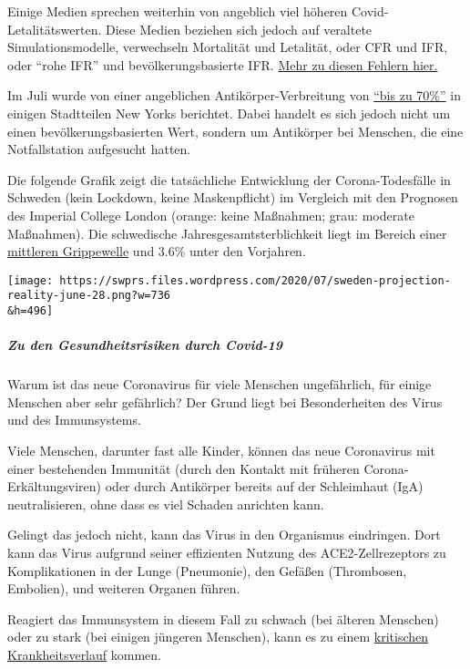 Einige Medien sprechen weiterhin von angeblich viel höheren
Covid-Letalitätswerten. Diese Medien beziehen sich jedoch auf veraltete
Simulationsmodelle, verwechseln Mortalität und Letalität, oder CFR und
IFR, oder ``rohe IFR'' und bevölkerungsbasierte IFR.
\href{https://swprs.org/covid-19-letalitat-wie-man-es-nicht-macht/}{Mehr
zu diesen Fehlern hier.}

Im Juli wurde von einer angeblichen Antikörper-Verbreitung von
\href{https://www.nytimes.com/2020/07/09/nyregion/nyc-coronavirus-antibodies.html}{``bis
zu 70\%''} in einigen Stadtteilen New Yorks berichtet. Dabei handelt es
sich jedoch nicht um einen bevölkerungs­basierten Wert, sondern um
Antikörper bei Menschen, die eine Notfallstation aufgesucht hatten.

Die folgende Grafik zeigt die tatsächliche Entwicklung der
Corona-Todesfälle in Schweden (kein Lockdown, keine Maskenpflicht) im
Vergleich mit den Prognosen des Imperial College London (orange: keine
Maßnahmen; grau: moderate Maßnahmen). Die schwedische
Jahres­gesamt­sterblichkeit liegt im Bereich einer
\href{https://swprs.files.wordpress.com/2020/06/sweden-all-cause-nov-may-1990.jpg}{mittleren
Grippewelle} und 3.6\% unter den Vorjahren.

\texttt{[image: https://swprs.files.wordpress.com/2020/07/sweden-projection-reality-june-28.png?w=736\\\&h=496]}

\hypertarget{zu-den-gesundheitsrisiken-durch-covid-19}{%
\subparagraph{\texorpdfstring{\textbf{Zu den Gesundheitsrisiken durch
Covid-19}}{Zu den Gesundheitsrisiken durch Covid-19}}\label{zu-den-gesundheitsrisiken-durch-covid-19}}

Warum ist das neue Coronavirus für viele Menschen ungefährlich, für
einige Menschen aber sehr gefährlich? Der Grund liegt bei Besonderheiten
des Virus und des Immunsystems.

Viele Menschen, darunter fast alle Kinder, können das neue Coronavirus
mit einer bestehenden Immunität (durch den Kontakt mit früheren
Corona-Erkältungsviren) oder durch Antikörper bereits auf der
Schleimhaut (IgA) neutralisieren, ohne dass es viel Schaden anrichten
kann.

Gelingt das jedoch nicht, kann das Virus in den Organismus eindringen.
Dort kann das Virus aufgrund seiner effizienten Nutzung des
ACE2-Zellrezeptors zu Komplikationen in der Lunge (Pneumonie), den
Gefäßen (Thrombosen, Embolien), und weiteren Organen führen.

Reagiert das Immunsystem in diesem Fall zu schwach (bei älteren
Menschen) oder zu stark (bei einigen jüngeren Menschen), kann es zu
einem
\href{https://www.hollywoodreporter.com/news/nick-cordero-dead-bullets-broadway-waitress-actor-was-41-1301841}{kritischen
Krankheitsverlauf} kommen.

